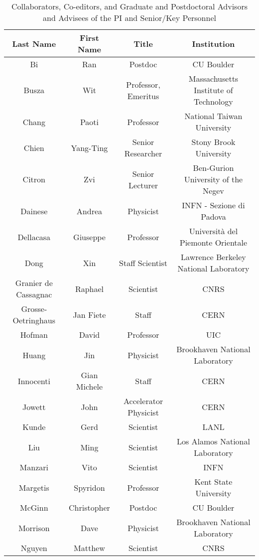 \begin{table}[h]
\centering
 \caption{Collaborators, Co-editors, and Graduate and Postdoctoral Advisors and Advisees of the PI and Senior/Key Personnel}
  \begin{tabular}{ | c | c | c | c | }
    \hline
    \textbf{Last Name} &  \textbf{First Name} &  \textbf{Title} & \textbf{Institution} \\ \hline
    Bi & Ran & Postdoc & CU Boulder \\ \hline
    Busza & Wit & Professor, Emeritus & Massachusetts Institute of Technology \\ \hline
    Chang & Paoti & Professor &  National Taiwan University\\ \hline
    Chien & Yang-Ting & Senior Researcher & Stony Brook University \\ \hline
    Citron & Zvi & Senior Lecturer & Ben-Gurion University of the Negev \\ \hline
    Dainese & Andrea & Physicist & INFN - Sezione di Padova \\ \hline
    Dellacasa & Giuseppe & Professor & Universit\`{a} del Piemonte Orientale\\ \hline
    Dong & Xin & Staff Scientist &  Lawrence Berkeley National Laboratory\\ \hline
    Granier de Cassagnac & Raphael & Scientist & CNRS\\ \hline
    Grosse-Oetringhaus & Jan Fiete & Staff & CERN \\ \hline
    Hofman & David & Professor & UIC \\ \hline
    Huang & Jin & Physicist & Brookhaven National Laboratory \\ \hline
    Innocenti & Gian Michele & Staff & CERN\\ \hline
    Jowett & John & Accelerator Physicist & CERN \\ \hline
    Kunde & Gerd & Scientist & LANL \\ \hline
    Liu & Ming & Scientist & Los Alamos National Laboratory \\ \hline
    Manzari & Vito & Scientist & INFN\\ \hline
    Margetis & Spyridon & Professor & Kent State University \\ \hline
    McGinn & Christopher & Postdoc & CU Boulder \\ \hline
    Morrison & Dave & Physicist & Brookhaven National Laboratory \\ \hline
    Nguyen & Matthew & Scientist & CNRS\\ \hline

\end{tabular}
\end{table}
